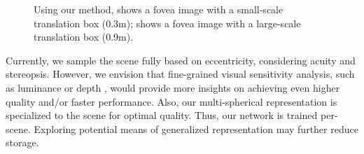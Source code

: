 \begin{figure}[!ht]
    \centering
    \hspace{1em}
    {%
    Using our method,  shows a fovea image  with a small-scale translation box (0.3m);  shows a fovea image with a large-scale translation box (0.9m).
    }
    \label{fig:large_translation}
\end{figure}

Currently, we sample the scene fully based on eccentricity, considering acuity and stereopsis. However, we envision that fine-grained visual sensitivity analysis, such as luminance \cite{Tursun:2019:LCA} or depth \cite{Sun:20:OE}, would provide more insights on achieving even higher quality and/or faster performance. Also, our multi-spherical representation is specialized to the scene for optimal quality. Thus, our network is trained per-scene. Exploring potential means of generalized representation may further reduce storage.

